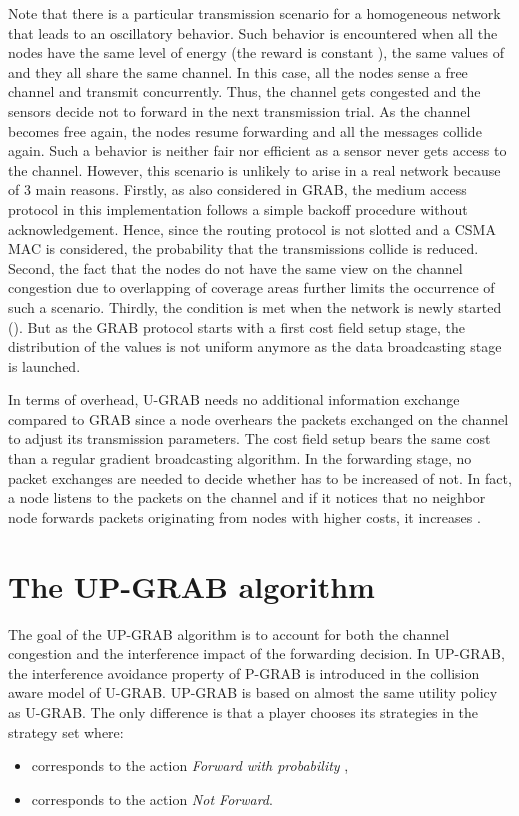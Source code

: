 \documentclass[journal, peerreview, onecolumn, draftcls]{IEEEtran}
\begin{document}
Note that there is a particular transmission scenario for a homogeneous network that leads to an oscillatory behavior. Such behavior is encountered when all the nodes have the same level of energy (the reward is constant ), the same values of  and they all share the same channel. In this case, all the nodes sense a free channel and transmit concurrently. Thus, the channel gets congested and the sensors decide not to forward in the next transmission trial. As the channel becomes free again, the nodes resume forwarding and all the messages collide again. Such a behavior is neither fair nor efficient as a sensor never gets access to the channel. However, this scenario is unlikely to arise in a real network because of 3 main reasons. Firstly, as also considered in GRAB, the medium access protocol in this implementation follows a simple backoff procedure without acknowledgement. Hence, since the routing protocol is not slotted and a CSMA MAC is considered, the probability that the transmissions collide is reduced. Second, the fact that the nodes do not have the same view on the channel congestion due to overlapping of coverage areas further limits the occurrence of such a scenario. Thirdly, the condition  is met when the network is newly started (). But as the GRAB protocol starts with a first cost field setup stage, the distribution of the  values is not uniform anymore as the data broadcasting stage is launched.

In terms of overhead, U-GRAB needs no additional information exchange compared to GRAB since a node overhears the packets exchanged on the channel to adjust its transmission parameters. The cost field setup bears the same cost than a regular gradient broadcasting algorithm. In the forwarding stage, no packet exchanges are needed to decide whether  has to be increased of not. In fact, a node listens to the packets on the channel and if it notices that no neighbor node forwards packets originating from nodes with higher costs, it increases .

\section{The UP-GRAB algorithm}\label{sec:PGGRAB}

The goal of the UP-GRAB algorithm is to account for both the channel congestion and the interference impact of the forwarding decision. In UP-GRAB, the interference avoidance property of P-GRAB is introduced in the collision aware model of U-GRAB.
UP-GRAB is based on almost the same utility policy as U-GRAB. The only difference is that a player  chooses its strategies  in the strategy set  where:
\begin{itemize}
\item  corresponds to the action {\it Forward with probability },
\item  corresponds to the action {\it Not Forward}.
\end{itemize}
\end{document}
